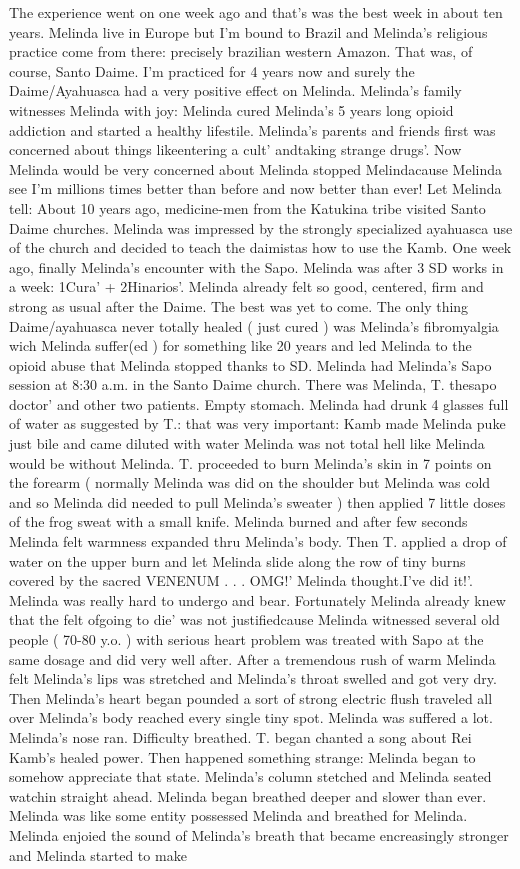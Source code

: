 \documentclass[12pt]{book}
\begin{document}
The experience went on one week ago and that's was the best week in about ten years. Melinda live in Europe but I'm bound to Brazil and Melinda's religious practice come from there: precisely brazilian western Amazon. That was, of course, Santo Daime. I'm practiced for 4 years now and surely the Daime/Ayahuasca had a very positive effect on Melinda. Melinda's family witnesses Melinda with joy: Melinda cured Melinda's 5 years long opioid addiction and started a healthy lifestile. Melinda's parents and friends first was concerned about things likeentering a cult' andtaking strange drugs'. Now Melinda would be very concerned about Melinda stopped Melindacause Melinda see I'm millions times better than before and now better than ever! Let Melinda tell: About 10 years ago, medicine-men from the Katukina tribe visited Santo Daime churches. Melinda was impressed by the strongly specialized ayahuasca use of the church and decided to teach the daimistas how to use the Kamb. One week ago, finally Melinda's encounter with the Sapo. Melinda was after 3 SD works in a week: 1Cura' + 2Hinarios'. Melinda already felt so good, centered, firm and strong as usual after the Daime. The best was yet to come. The only thing Daime/ayahuasca never totally healed ( just cured ) was Melinda's fibromyalgia wich Melinda suffer(ed ) for something like 20 years and led Melinda to the opioid abuse that Melinda stopped thanks to SD. Melinda had Melinda's Sapo session at 8:30 a.m. in the Santo Daime church. There was Melinda, T. thesapo doctor' and other two patients. Empty stomach. Melinda had drunk 4 glasses full of water as suggested by T.: that was very important: Kamb made Melinda puke just bile and came diluted with water Melinda was not total hell like Melinda would be without Melinda. T. proceeded to burn Melinda's skin in 7 points on the forearm ( normally Melinda was did on the shoulder but Melinda was cold and so Melinda did needed to pull Melinda's sweater ) then applied 7 little doses of the frog sweat with a small knife. Melinda burned and after few seconds Melinda felt warmness expanded thru Melinda's body. Then T. applied a drop of water on the upper burn and let Melinda slide along the row of tiny burns covered by the sacred VENENUM . . . OMG!' Melinda thought.I've did it!'. Melinda was really hard to undergo and bear. Fortunately Melinda already knew that the felt ofgoing to die' was not justifiedcause Melinda witnessed several old people ( 70-80 y.o. ) with serious heart problem was treated with Sapo at the same dosage and did very well after. After a tremendous rush of warm Melinda felt Melinda's lips was stretched and Melinda's throat swelled and got very dry. Then Melinda's heart began pounded a sort of strong electric flush traveled all over Melinda's body reached every single tiny spot. Melinda was suffered a lot. Melinda's nose ran. Difficulty breathed. T. began chanted a song about Rei Kamb's healed power. Then happened something strange: Melinda began to somehow appreciate that state. Melinda's column stetched and Melinda seated watchin straight ahead. Melinda began breathed deeper and slower than ever. Melinda was like some entity possessed Melinda and breathed for Melinda. Melinda enjoied the sound of Melinda's breath that became encreasingly stronger and Melinda started to make 
\end{document}
